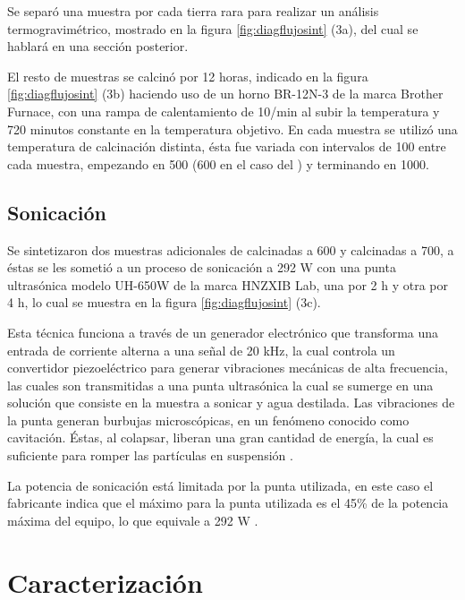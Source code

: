 \documentclass[../main.tex]{subfiles}
\begin{document}
    Se separó una muestra por cada tierra rara para realizar un análisis termogravimétrico, mostrado en la figura \ref{fig:diagflujosint} (3a), del cual se hablará en una sección posterior.

    El resto de muestras se calcinó por 12 horas, indicado en la figura \ref{fig:diagflujosint} (3b) haciendo uso de un horno BR-12N-3 de la marca Brother Furnace, con una rampa de calentamiento de 10\gradoC{}/min al subir la temperatura y 720 minutos constante en la temperatura objetivo. En cada muestra se utilizó una temperatura de calcinación distinta, ésta fue variada con intervalos de 100\gradoC{} entre cada muestra, empezando en 500\gradoC{} (600\gradoC{} en el caso del \sama{}) y terminando en 1000\gradoC{}.
\subsection{Sonicación}
    Se sintetizaron dos muestras adicionales de \neod{} calcinadas a 600\gradoC{} y \sama{} calcinadas a 700\gradoC{}, a éstas se les sometió a un proceso de sonicación a 292 W con una punta ultrasónica modelo UH-650W de la marca HNZXIB Lab, una por 2 h y otra por 4 h, lo cual se muestra en la figura \ref{fig:diagflujosint} (3c).

    Esta técnica funciona a través de un generador electrónico que transforma una entrada de corriente alterna a una señal de 20 kHz, la cual controla un convertidor piezoeléctrico para generar vibraciones mecánicas de alta frecuencia, las cuales son transmitidas a una punta ultrasónica la cual se sumerge en una solución que consiste en la muestra a sonicar y agua destilada. Las vibraciones de la punta generan burbujas microscópicas, en un fenómeno conocido como cavitación. Éstas, al colapsar, liberan una gran cantidad de energía, la cual es suficiente para romper las partículas en suspensión \cite{sonicaciondef}.

    La potencia de sonicación está limitada por la punta utilizada, en este caso el fabricante indica que el máximo para la punta utilizada es el 45\% de la potencia máxima del equipo, lo que equivale a 292 W \cite{manualpunta}.
\section{Caracterización}
\end{document}
